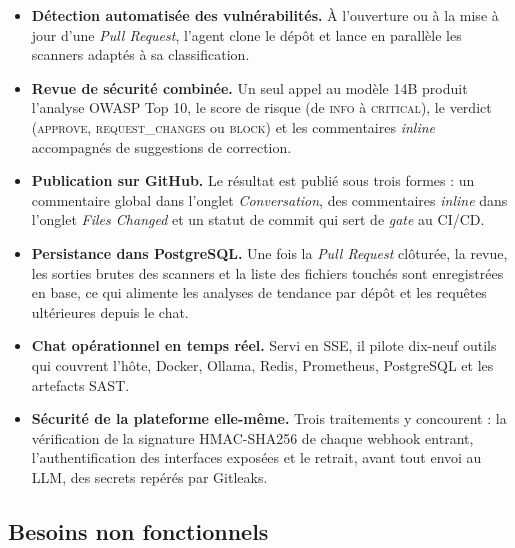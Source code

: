         \begin{itemize}
            \item \textbf{Détection automatisée des vulnérabilités.} À l'ouverture ou à la
            mise à jour d'une \textit{Pull Request}, l'agent clone le dépôt et lance en
            parallèle les scanners adaptés à sa classification.

            \item \textbf{Revue de sécurité combinée.} Un seul appel au modèle 14B produit
            l'analyse OWASP Top 10, le score de risque (de \textsc{info} à \textsc{critical}),
            le verdict (\textsc{approve}, \textsc{request\_changes} ou \textsc{block}) et les
            commentaires \textit{inline} accompagnés de suggestions de correction.

            \item \textbf{Publication sur GitHub.} Le résultat est publié sous trois formes :
            un commentaire global dans l'onglet \textit{Conversation}, des commentaires
            \textit{inline} dans l'onglet \textit{Files Changed} et un statut de commit qui
            sert de \textit{gate} au CI/CD.

            \item \textbf{Persistance dans PostgreSQL.} Une fois la \textit{Pull Request}
            clôturée, la revue, les sorties brutes des scanners et la liste des fichiers
            touchés sont enregistrées en base, ce qui alimente les analyses de tendance par
            dépôt et les requêtes ultérieures depuis le chat.

            \item \textbf{Chat opérationnel en temps réel.} Servi en SSE, il pilote
            dix-neuf outils qui couvrent l'hôte, Docker, Ollama, Redis, Prometheus,
            PostgreSQL et les artefacts SAST.

            \item \textbf{Sécurité de la plateforme elle-même.} Trois traitements y
            concourent : la vérification de la signature HMAC-SHA256 de chaque webhook
            entrant, l'authentification des interfaces exposées et le retrait, avant tout
            envoi au LLM, des secrets repérés par Gitleaks.
        \end{itemize}

    \subsection{Besoins non fonctionnels}

